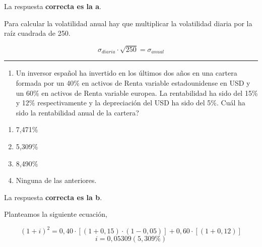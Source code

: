 \documentclass[
  letterpaper,
  DIV=11,
  numbers=noendperiod]{scrreprt}
\providecommand{\tightlist}{%
  \setlength{\itemsep}{0pt}\setlength{\parskip}{0pt}}\usepackage{longtable,booktabs,array}
\begin{document}
\begin{tcolorbox}[enhanced jigsaw, left=2mm, opacityback=0, colback=white, breakable, arc=.35mm, bottomrule=.15mm, rightrule=.15mm, toprule=.15mm, leftrule=.75mm, colframe=quarto-callout-tip-color-frame]
\begin{minipage}[t]{5.5mm}
\textcolor{quarto-callout-tip-color}{\faLightbulb}
\end{minipage}%
\begin{minipage}[t]{\textwidth - 5.5mm}

La respuesta \textbf{correcta es la a}.

Para calcular la volatilidad anual hay que multiplicar la volatilidad
diaria por la raíz cuadrada de 250.

\[\sigma_{diaria}\cdot\sqrt{250}=\sigma_{anual}\]

\end{minipage}%
\end{tcolorbox}

\begin{center}\rule{0.5\linewidth}{0.5pt}\end{center}

\begin{enumerate}
\def\labelenumi{\arabic{enumi}.}
\setcounter{enumi}{101}
\tightlist
\item
  Un inversor español ha invertido en los últimos dos años en una
  cartera formada por un 40\% en activos de Renta variable
  estadounidense en USD y un 60\% en activos de Renta variable europea.
  La rentabilidad ha sido del 15\% y 12\% respectivamente y la
  depreciación del USD ha sido del 5\%. Cuál ha sido la rentabilidad
  anual de la cartera?
\end{enumerate}

\begin{enumerate}
\def\labelenumi{\alph{enumi})}
\item
  7,471\%
\item
  5,309\%
\item
  8,490\%
\item
  Ninguna de las anteriores.
\end{enumerate}

\begin{tcolorbox}[enhanced jigsaw, left=2mm, opacityback=0, colback=white, breakable, arc=.35mm, bottomrule=.15mm, rightrule=.15mm, toprule=.15mm, leftrule=.75mm, colframe=quarto-callout-tip-color-frame]
\begin{minipage}[t]{5.5mm}
\textcolor{quarto-callout-tip-color}{\faLightbulb}
\end{minipage}%
\begin{minipage}[t]{\textwidth - 5.5mm}

La respuesta \textbf{correcta es la b}.

Planteamos la siguiente ecuación,

\[(1+i)^2=0,40\cdot [(1+0,15)\cdot(1-0,05)]+0,60\cdot [(1+0,12)]\]
\[i=0,05309(5,309\%)\]

\end{minipage}%
\end{tcolorbox}
\end{document}
